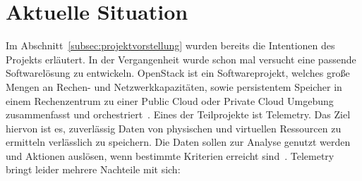 \section{Aktuelle Situation}
Im Abschnitt~\ref{subsec:projektvorstellung} wurden bereits die Intentionen
des Projekts erläutert. In der Vergangenheit wurde schon mal versucht eine
passende Softwarelösung zu entwickeln. OpenStack ist ein Softwareprojekt,
welches große Mengen an Rechen- und Netzwerkkapazitäten, sowie persistentem
Speicher in einem Rechenzentrum zu einer \gls{Public Cloud} oder \gls{Private
Cloud} Umgebung zusammenfasst und orchestriert~\cite{OpenStack_Intro}. Eines
der Teilprojekte ist Telemetry. Das Ziel hiervon ist es, zuverlässig Daten von
physischen und virtuellen Ressourcen zu ermitteln verlässlich zu speichern. Die
Daten sollen zur Analyse genutzt werden und Aktionen auslösen, wenn bestimmte
Kriterien erreicht sind~\cite{OpenStack_Telemetry}. Telemetry bringt leider
mehrere Nachteile mit sich:

